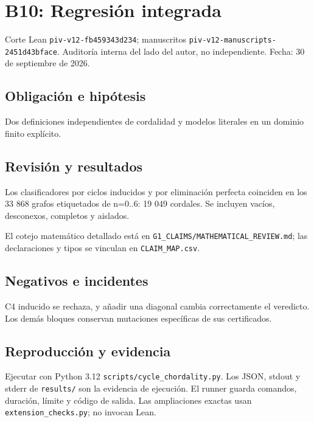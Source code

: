 \documentclass[11pt]{article}
\begin{document}
\section{B10: Regresión integrada}\label{b10-regresiuxf3n-integrada}

Corte Lean \nolinkurl{piv-v12-fb459343d234}; manuscritos
\nolinkurl{piv-v12-manuscripts-2451d43bface}. Auditoría interna del lado
del autor, no independiente. Fecha: 30 de septiembre de 2026.

\subsection{Obligación e hipótesis}\label{obligaciuxf3n-e-hipuxf3tesis}

Dos definiciones independientes de cordalidad y modelos literales en un
dominio finito explícito.

\subsection{Revisión y resultados}\label{revisiuxf3n-y-resultados}

Los clasificadores por ciclos inducidos y por eliminación perfecta
coinciden en los 33 868 grafos etiquetados de n=0..6: 19 049 cordales.
Se incluyen vacíos, desconexos, completos y aislados.

El cotejo matemático detallado está en
\nolinkurl{G1_CLAIMS/MATHEMATICAL_REVIEW.md}; las declaraciones y tipos
se vinculan en \nolinkurl{CLAIM_MAP.csv}.

\subsection{Negativos e incidentes}\label{negativos-e-incidentes}

C4 inducido se rechaza, y añadir una diagonal cambia correctamente el
veredicto. Los demás bloques conservan mutaciones específicas de sus
certificados.

\subsection{Reproducción y evidencia}\label{reproducciuxf3n-y-evidencia}

Ejecutar con Python 3.12 \nolinkurl{scripts/cycle_chordality.py}. Los
JSON, stdout y stderr de \nolinkurl{results/} son la evidencia de
ejecución. El runner guarda comandos, duración, límite y código de
salida. Las ampliaciones exactas usan \nolinkurl{extension_checks.py}; no
invocan Lean.
\end{document}
